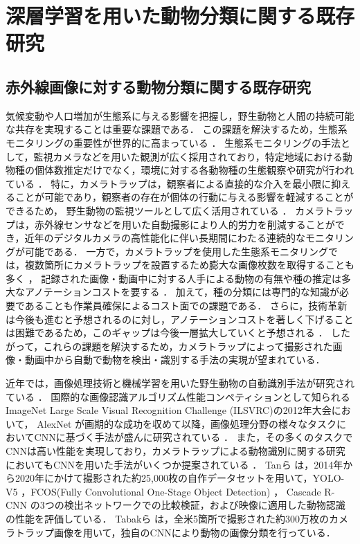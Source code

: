 \documentclass[a4paper,11pt,nomag]{jsreport}
\begin{document}
\setcounter{chapter}{2}

\chapter*{深層学習を用いた動物分類に関する既存研究}

\section{赤外線画像に対する動物分類に関する既存研究}

気候変動や人口増加が生態系に与える影響を把握し，野生動物と人間の持続可能な共存を実現することは重要な課題である．
この課題を解決するため，生態系モニタリングの重要性が世界的に高まっている \cite{zwerts2021, bandaru2024}．
生態系モニタリングの手法として，監視カメラなどを用いた観測が広く採用されており，特定地域における動物種の個体数推定だけでなく，環境に対する各動物種の生態観察や研究が行われている \cite{trolliet2014}．
特に，カメラトラップは，観察者による直接的な介入を最小限に抑えることが可能であり，観察者の存在が個体の行動に与える影響を軽減することができるため，
野生動物の監視ツールとして広く活用されている \cite{本郷2018, abood2023}．
カメラトラップは，赤外線センサなどを用いた自動撮影により人的労力を削減することができ，近年のデジタルカメラの高性能化に伴い長期間にわたる連続的なモニタリングが可能である．
一方で，カメラトラップを使用した生態系モニタリングでは，複数箇所にカメラトラップを設置するため膨大な画像枚数を取得することも多く \cite{kays2020, si2014}，
記録された画像・動画中に対する人手による動物の有無や種の推定は多大なアノテーションコストを要する \cite{thangaraj2023}．
加えて，種の分類には専門的な知識が必要であることも作業員確保によるコスト面での課題である．
さらに，技術革新は今後も進むと予想されるのに対し，アノテーションコストを著しく下げることは困難であるため，このギャップは今後一層拡大していくと予想される \cite{安藤2019}．
したがって，これらの課題を解決するため，カメラトラップによって撮影された画像・動画中から自動で動物を検出・識別する手法の実現が望まれている．

近年では，画像処理技術と機械学習を用いた野生動物の自動識別手法が研究されている \cite{manna2023, mohanty2022}．
国際的な画像認識アルゴリズム性能コンペティションとして知られるImageNet Large Scale Visual Recognition Challenge (ILSVRC)の2012年大会において，
AlexNet \cite{alexnet}が画期的な成功を収めて以降，画像処理分野の様々なタスクにおいてCNNに基づく手法が盛んに研究されている \cite{mohanty2016, sue2020}．
また，その多くのタスクでCNNは高い性能を実現しており，カメラトラップによる動物識別に関する研究においてもCNNを用いた手法がいくつか提案されている \cite{agarwal2023, neeli2023, thangaraj2023, abood2023}．
Tanら \cite{tan2022}は，2014年から2020年にかけて撮影された約25,000枚の自作データセットを用いて，YOLO-V5 \cite{yolov5}，FCOS(Fully Convolutional One-Stage Object Detection) \cite{fcos}，
Cascade R-CNN \cite{cascade}の3つの検出ネットワークでの比較検証，および映像に適用した動物認識の性能を評価している．
Tabakら \cite{tabak2019}は，全米5箇所で撮影された約300万枚のカメラトラップ画像を用いて，独自のCNNにより動物の画像分類を行っている．
\end{document}
